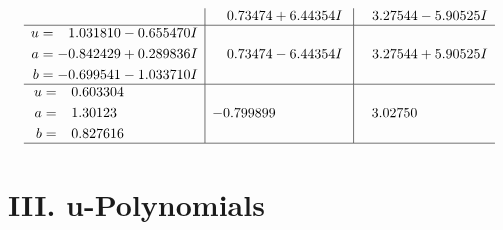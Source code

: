 \documentclass[1p]{elsarticle_modified}
\theoremstyle{definition}
\begin{document}
$$\begin{array}{c|c|c}
 & \phantom{-}0.73474 + 6.44354 I & \phantom{-}3.27544 - 5.90525 I \\ \hline\begin{aligned}
u &= \phantom{-}1.031810 - 0.655470 I \\
a &= -0.842429 + 0.289836 I \\
b &= -0.699541 - 1.033710 I\end{aligned}
 & \phantom{-}0.73474 - 6.44354 I & \phantom{-}3.27544 + 5.90525 I \\ \hline\begin{aligned}
u &= \phantom{-}0.603304\phantom{ +0.000000I} \\
a &= \phantom{-}1.30123\phantom{ +0.000000I} \\
b &= \phantom{-}0.827616\phantom{ +0.000000I}\end{aligned}
 & -0.799899\phantom{ +0.000000I} & \phantom{-}3.02750\phantom{ +0.000000I}\\
 \hline 
 \end{array}$$\newpage
\newpage\renewcommand{\arraystretch}{1}
\centering \section*{ III. u-Polynomials}
\end{document}
